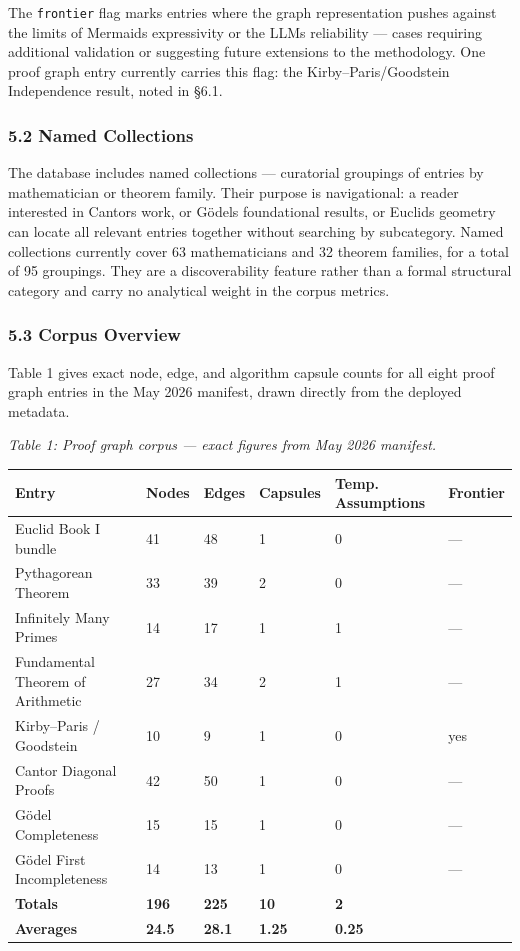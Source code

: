 \documentclass[
  11pt]{article}
\begin{document}
The \texttt{frontier} flag marks entries where the graph representation
pushes against the limits of Mermaid\textquotesingle s expressivity or
the LLM\textquotesingle s reliability --- cases requiring additional
validation or suggesting future extensions to the methodology. One proof
graph entry currently carries this flag: the Kirby--Paris/Goodstein
Independence result, noted in §6.1.

\hypertarget{52-named-collections}{%
\subsubsection{5.2 Named Collections}\label{52-named-collections}}

The database includes named collections --- curatorial groupings of
entries by mathematician or theorem family. Their purpose is
navigational: a reader interested in Cantor\textquotesingle s work, or
Gödel\textquotesingle s foundational results, or
Euclid\textquotesingle s geometry can locate all relevant entries
together without searching by subcategory. Named collections currently
cover 63 mathematicians and 32 theorem families, for a total of 95
groupings. They are a discoverability feature rather than a formal
structural category and carry no analytical weight in the corpus
metrics.

\hypertarget{53-corpus-overview}{%
\subsubsection{5.3 Corpus Overview}\label{53-corpus-overview}}

Table 1 gives exact node, edge, and algorithm capsule counts for all
eight proof graph entries in the May 2026 manifest, drawn directly from
the deployed metadata.

\emph{Table 1: Proof graph corpus --- exact figures from May 2026
manifest.}

\begin{longtable}[]{@{}llllll@{}}
\toprule\noalign{}
Entry & Nodes & Edges & Capsules & Temp. Assumptions & Frontier \\
\midrule\noalign{}
\endhead
\bottomrule\noalign{}
\endlastfoot
Euclid Book I bundle & 41 & 48 & 1 & 0 & --- \\
Pythagorean Theorem & 33 & 39 & 2 & 0 & --- \\
Infinitely Many Primes & 14 & 17 & 1 & 1 & --- \\
Fundamental Theorem of Arithmetic & 27 & 34 & 2 & 1 & --- \\
Kirby--Paris / Goodstein & 10 & 9 & 1 & 0 & yes \\
Cantor Diagonal Proofs & 42 & 50 & 1 & 0 & --- \\
Gödel Completeness & 15 & 15 & 1 & 0 & --- \\
Gödel First Incompleteness & 14 & 13 & 1 & 0 & --- \\
\textbf{Totals} & \textbf{196} & \textbf{225} & \textbf{10} & \textbf{2}
& \\
\textbf{Averages} & \textbf{24.5} & \textbf{28.1} & \textbf{1.25} &
\textbf{0.25} & \\
\end{longtable}
\end{document}
